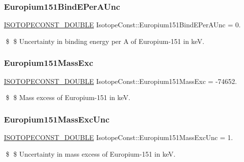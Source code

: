 \subsubsection{\texorpdfstring{Europium151\+Bind\+E\+Per\+A\+Unc}{Europium151BindEPerAUnc}}
{\footnotesize\ttfamily \mbox{\hyperlink{group___isotope_const-_macros_ga8f45a7272ce02c0b4c65c44636ed719a}{I\+S\+O\+T\+O\+P\+E\+C\+O\+N\+S\+T\+\_\+\+D\+O\+U\+B\+LE}} Isotope\+Const\+::\+Europium151\+Bind\+E\+Per\+A\+Unc = 0.}

\$ \$ Uncertainty in binding energy per A of Europium-\/151 in keV. \mbox{\label{group___isotope_const-_europium-_eu151_ga47b393bd4ab2ac294388fa940490a932}} 
\subsubsection{\texorpdfstring{Europium151\+Mass\+Exc}{Europium151MassExc}}
{\footnotesize\ttfamily \mbox{\hyperlink{group___isotope_const-_macros_ga8f45a7272ce02c0b4c65c44636ed719a}{I\+S\+O\+T\+O\+P\+E\+C\+O\+N\+S\+T\+\_\+\+D\+O\+U\+B\+LE}} Isotope\+Const\+::\+Europium151\+Mass\+Exc = -\/74652.}

\$ \$ Mass excess of Europium-\/151 in keV. \mbox{\label{group___isotope_const-_europium-_eu151_gafd3b202c3197132445afc591960f684b}} 
\subsubsection{\texorpdfstring{Europium151\+Mass\+Exc\+Unc}{Europium151MassExcUnc}}
{\footnotesize\ttfamily \mbox{\hyperlink{group___isotope_const-_macros_ga8f45a7272ce02c0b4c65c44636ed719a}{I\+S\+O\+T\+O\+P\+E\+C\+O\+N\+S\+T\+\_\+\+D\+O\+U\+B\+LE}} Isotope\+Const\+::\+Europium151\+Mass\+Exc\+Unc = 1.}

\$ \$ Uncertainty in mass excess of Europium-\/151 in keV. \mbox{\label{group___isotope_const-_europium-_eu151_gac34ae3090ede7500a0f299989e6f2760}} 
